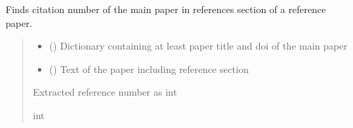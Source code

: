 \documentclass[letterpaper,10pt,english]{sphinxmanual}
\begin{document}
\begin{fulllineitems}
\label{\detokenize{reference_analysis:reference_analysis.find_citation_number}}
\pysigstartsignatures
\pysiglinewithargsret
{}
{\sphinxparamcomma {}}
{}
\pysigstopsignatures
\sphinxAtStartPar
Finds citation number of the main paper in references section of a reference paper.
\begin{quote}\begin{description}
\begin{itemize}
\item {} 
\sphinxAtStartPar
{} () \textendash{} Dictionary containing at least paper title and doi of the main paper

\item {} 
\sphinxAtStartPar
{} () \textendash{} Text of the paper including reference section

\end{itemize}

\sphinxAtStartPar
Extracted reference number as int

\sphinxAtStartPar
int

\end{description}\end{quote}

\end{fulllineitems}

\end{document}
